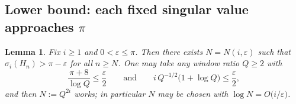 \documentclass[12pt]{article}
\newtheorem{lemma}{Lemma}
\theoremstyle{remark}
\begin{document}
\subsection{Lower bound: each fixed singular value approaches $\pi$}

\begin{lemma}\label{lem:lower}
Fix $i\ge1$ and $0<\varepsilon\le\pi$. Then there exists $N=N(i,\varepsilon)$ such that
$\sigma_i(H_n)>\pi-\varepsilon$ for all $n\ge N$. One may take any window ratio $Q\ge2$ with
\begin{equation}\label{eq:Qconds}
\frac{\pi+8}{\log Q}\le\frac{\varepsilon}{2}\qquad\text{and}\qquad
i\,Q^{-1/2}\bigl(1+\log Q\bigr)\le\frac{\varepsilon}{2},
\end{equation}
and then $N:=Q^{2i}$ works; in particular $N$ may be chosen with $\log N=O\bigl(i/\varepsilon\bigr)$.
\end{lemma}
\end{document}
